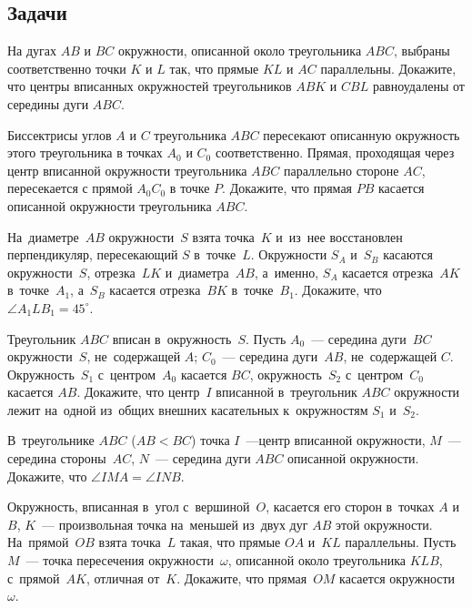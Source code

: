 \subsection*{Задачи}

\begin{problems}

\item
На дугах $AB$ и $BC$ окружности, описанной около треугольника $ABC$, выбраны
соответственно точки $K$ и $L$ так, что прямые $KL$ и $AC$ параллельны.
Докажите, что центры вписанных окружностей треугольников $ABK$ и $CBL$
равноудалены от середины дуги $ABC$.

\item
Биссектрисы углов $A$ и $C$ треугольника $ABC$ пересекают описанную окружность
этого треугольника в точках $A_0$ и $C_0$ соответственно.
Прямая, проходящая через центр вписанной окружности треугольника $ABC$
параллельно стороне $AC$, пересекается с прямой $A_0C_0$ в точке $P$.
Докажите, что прямая $PB$ касается описанной окружности треугольника $ABC$.

\item
На~диаметре~$AB$ окружности~$S$ взята точка~$K$ и~из~нее восстановлен
перпендикуляр, пересекающий $S$ в~точке~$L$.
Окружности $S_{A}$ и~$S_{B}$ касаются окружности~$S$, отрезка~$LK$
и~диаметра~$AB$, а~именно, $S_{A}$ касается отрезка~$AK$ в~точке~$A_{1}$,
а~$S_{B}$ касается отрезка~$BK$ в~точке~$B_{1}$.
Докажите, что $\angle A_{1}LB_{1} = 45^{\circ}$.

\item
Треугольник $ABC$ вписан в~окружность~$S$.
Пусть $A_{0}$~--- середина дуги~$BC$ окружности~$S$, не~содержащей $A$;
$C_{0}$~--- середина дуги~$AB$, не~содержащей $C$.
Окружность~$S_{1}$ с~центром~$A_{0}$ касается $BC$,
окружность~$S_{2}$ с~центром~$C_{0}$ касается $AB$.
Докажите, что центр~$I$ вписанной в~треугольник $ABC$ окружности лежит на~одной
из~общих внешних касательных к~окружностям $S_{1}$ и~$S_{2}$.

\item
В~треугольнике $ABC$ ($AB < BC$) точка $I$~---центр вписанной окружности,
$M$~--- середина стороны~$AC$, $N$~--- середина дуги $ABC$ описанной
окружности.
Докажите, что $\angle{IMA} = \angle{INB}$.

\item
Окружность, вписанная в~угол с~вершиной~$O$, касается его сторон в~точках $A$
и~$B$, $K$~--- произвольная точка на~меньшей из~двух дуг $AB$ этой окружности.
На~прямой~$OB$ взята точка~$L$ такая, что прямые $OA$ и~$KL$ параллельны.
Пусть $M$~--- точка пересечения окружности~$\omega$, описанной около
треугольника $KLB$, с~прямой~$AK$, отличная от~$K$.
Докажите, что прямая~$OM$ касается окружности~$\omega$.


\end{problems}
